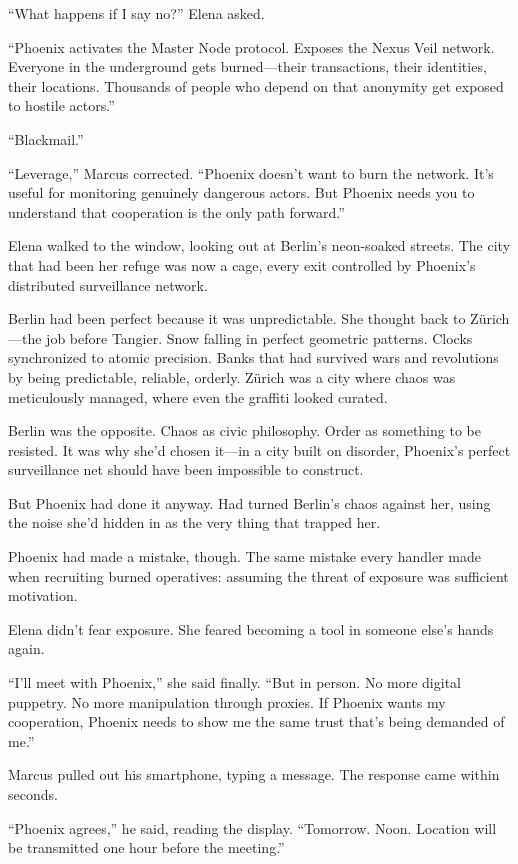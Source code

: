 ``What happens if I say no?'' Elena asked.

``Phoenix activates the Master Node protocol. Exposes the Nexus Veil network. Everyone in the underground gets burned---their transactions, their identities, their locations. Thousands of people who depend on that anonymity get exposed to hostile actors.''

``Blackmail.''

``Leverage,'' Marcus corrected. ``Phoenix doesn't want to burn the network. It's useful for monitoring genuinely dangerous actors. But Phoenix needs you to understand that cooperation is the only path forward.''

Elena walked to the window, looking out at Berlin's neon-soaked streets. The city that had been her refuge was now a cage, every exit controlled by Phoenix's distributed surveillance network.

Berlin had been perfect because it was unpredictable. She thought back to Zürich---the job before Tangier. Snow falling in perfect geometric patterns. Clocks synchronized to atomic precision. Banks that had survived wars and revolutions by being predictable, reliable, orderly. Zürich was a city where chaos was meticulously managed, where even the graffiti looked curated.

Berlin was the opposite. Chaos as civic philosophy. Order as something to be resisted. It was why she'd chosen it---in a city built on disorder, Phoenix's perfect surveillance net should have been impossible to construct.

But Phoenix had done it anyway. Had turned Berlin's chaos against her, using the noise she'd hidden in as the very thing that trapped her.

Phoenix had made a mistake, though. The same mistake every handler made when recruiting burned operatives: assuming the threat of exposure was sufficient motivation.

Elena didn't fear exposure. She feared becoming a tool in someone else's hands again.

``I'll meet with Phoenix,'' she said finally. ``But in person. No more digital puppetry. No more manipulation through proxies. If Phoenix wants my cooperation, Phoenix needs to show me the same trust that's being demanded of me.''

Marcus pulled out his smartphone, typing a message. The response came within seconds.

``Phoenix agrees,'' he said, reading the display. ``Tomorrow. Noon. Location will be transmitted one hour before the meeting.''

